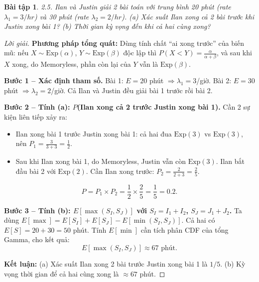 \documentclass[8pt,a4paper]{article}
\newtheorem{exercise}{Bài tập}
\newenvironment{solution}{\begin{proof}[Lời giải]}{\end{proof}}
\begin{document}
\begin{exercise}
2.5. Ilan và Justin giải 2 bài toán với trung bình 20 phút (rate $\lambda_1 = 3/hr$) và 30 phút (rate $\lambda_2 = 2/hr$). 
(a) Xác suất Ilan xong cả 2 bài trước khi Justin xong bài 1?
(b) Thời gian kỳ vọng đến khi cả hai cùng xong?
\end{exercise}
\begin{solution}
\textbf{Phương pháp tổng quát:} Dùng tính chất ``ai xong trước'' của biến mũ: nếu $X \sim \text{Exp}(\alpha)$, $Y \sim \text{Exp}(\beta)$ độc lập thì $P(X < Y) = \frac{\alpha}{\alpha+\beta}$, và sau khi $X$ xong, do Memoryless, phần còn lại của $Y$ vẫn là $\text{Exp}(\beta)$.

\textbf{Bước 1 -- Xác định tham số.} Bài 1: $E = 20$ phút $\Rightarrow \lambda_1 = 3$/giờ. Bài 2: $E = 30$ phút $\Rightarrow \lambda_2 = 2$/giờ. Cả Ilan và Justin đều giải bài 1 trước rồi bài 2.

\textbf{Bước 2 -- Tính (a): $P$(Ilan xong cả 2 trước Justin xong bài 1).} Cần 2 sự kiện liên tiếp xảy ra:
\begin{itemize}[nosep]
  \item Ilan xong bài 1 trước Justin xong bài 1: cả hai đua $\text{Exp}(3)$ vs $\text{Exp}(3)$, nên $P_1 = \frac{3}{3+3} = \frac{1}{2}$.
  \item Sau khi Ilan xong bài 1, do Memoryless, Justin vẫn còn $\text{Exp}(3)$. Ilan bắt đầu bài 2 với $\text{Exp}(2)$. Cần Ilan xong trước: $P_2 = \frac{2}{2+3} = \frac{2}{5}$.
\end{itemize}
\[
  P = P_1 \times P_2 = \frac{1}{2} \times \frac{2}{5} = \boxed{\frac{1}{5} = 0.2}.
\]

\textbf{Bước 3 -- Tính (b): $E[\max(S_I, S_J)]$ với $S_I = I_1 + I_2$, $S_J = J_1 + J_2$.} Ta dùng $E[\max] = E[S_I] + E[S_J] - E[\min(S_I, S_J)]$. Cả hai có $E[S] = 20 + 30 = 50$ phút. Tính $E[\min]$ cần tích phân CDF của tổng Gamma, cho kết quả:
\[
  E[\max(S_I, S_J)] \approx \boxed{67 \text{ phút}}.
\]

\textbf{Kết luận:} (a) Xác suất Ilan xong 2 bài trước Justin xong bài 1 là $1/5$. (b) Kỳ vọng thời gian để cả hai cùng xong là $\approx 67$ phút.
\end{solution}
\end{document}
